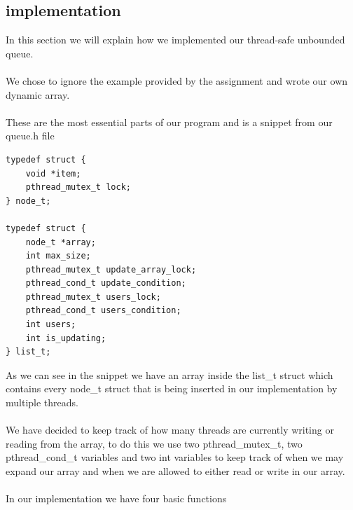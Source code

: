 \documentclass[a4paper,12pt,danish]{report}
\begin{document}
\subsection{implementation}
In this section we will explain how we implemented our thread-safe unbounded queue.
\\
\\
We chose to ignore the example provided by the assignment and wrote our own dynamic array.
\\
\\
These are the most essential parts of our program and is a snippet from our queue.h file
\begin{lstlisting}
typedef struct {
    void *item;
    pthread_mutex_t lock;
} node_t;

typedef struct {
    node_t *array;
    int max_size;
    pthread_mutex_t update_array_lock;
    pthread_cond_t update_condition;
    pthread_mutex_t users_lock;
    pthread_cond_t users_condition;
    int users;
    int is_updating;
} list_t;
\end{lstlisting}
As we can see in the snippet we have an array inside the list\_t struct which contains every node\_t struct that is being inserted in our implementation by multiple threads.
\\
\\
We have decided to keep track of how many threads are currently writing or reading from the array, to do this we use two pthread\_mutex\_t, two pthread\_cond\_t variables and two int variables to keep track of when we may expand our array and when we are allowed to either read or write in our array.
\\
\\
In our implementation we have four basic functions
\end{document}
